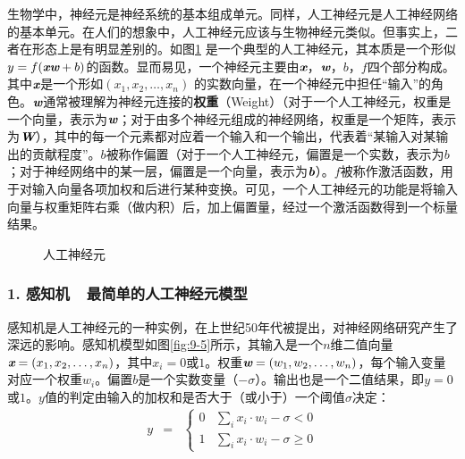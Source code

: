 \parinterval 生物学中，神经元是神经系统的基本组成单元。同样，人工神经元是人工神经网络的基本单元。在人们的想象中，人工神经元应该与生物神经元类似。但事实上，二者在形态上是有明显差别的。如图\ref{fig:9-4} 是一个典型的人工神经元，其本质是一个形似$ y=f({\textbf{\em x}}{\textbf{\em w}}+b) $的函数。显而易见，一个神经元主要由$ {\textbf{\em x}} $，$ {\textbf{\em w}} $，$ b $，$ f $四个部分构成。其中$ {\textbf{\em x}} $是一个形如$ (x_1,x_2,\dots,x_n) $ 的实数向量，在一个神经元中担任“输入”的角色。$ {\textbf{\em w}} $通常被理解为神经元连接的{\small\sffamily\bfseries{权重}}（Weight）（对于一个人工神经元，权重是一个向量，表示为$ {\textbf{\em w}} $；对于由多个神经元组成的神经网络，权重是一个矩阵，表示为$ {\textbf{\em W}} $），其中的每一个元素都对应着一个输入和一个输出，代表着“某输入对某输出的贡献程度”。$ b $被称作偏置（对于一个人工神经元，偏置是一个实数，表示为$b$；对于神经网络中的某一层，偏置是一个向量，表示为${\textbf{\em b}}$）。$ f $被称作激活函数，用于对输入向量各项加权和后进行某种变换。可见，一个人工神经元的功能是将输入向量与权重矩阵右乘（做内积）后，加上偏置量，经过一个激活函数得到一个标量结果。

\begin{figure}[htp]
\centering

\caption{人工神经元}
\label{fig:9-4}
\end{figure}


\vspace{-0.5em}
\subsubsection{1. 感知机\ \dash \ 最简单的人工神经元模型}

\vspace{0.5em}
\parinterval 感知机是人工神经元的一种实例，在上世纪50年代被提出，对神经网络研究产生了深远的影响。感知机模型如图\ref {fig:9-5}所示，其输入是一个$n$维二值向量$ {\textbf{\em x}}=(x_1,x_2,\dots,x_n) $，其中$ x_i=0 $或$ 1 $。权重${\textbf{\em w}}=(w_1,w_2,\dots,w_n) $，每个输入变量对应一个权重$ w_i $。偏置$ b $是一个实数变量（$ -\sigma $）。输出也是一个二值结果，即$ y=0 $或$ 1 $。$ y $值的判定由输入的加权和是否大于（或小于）一个阈值$ \sigma $决定：
\begin{eqnarray}
y&=&\begin{cases} 0 & \sum_{i}{x_i\cdot w_i}-\sigma <0\\1 & \sum_{i}{x_i\cdot w_i}-\sigma \geqslant 0\end{cases}
\label{eq:9-19}
\end{eqnarray}

